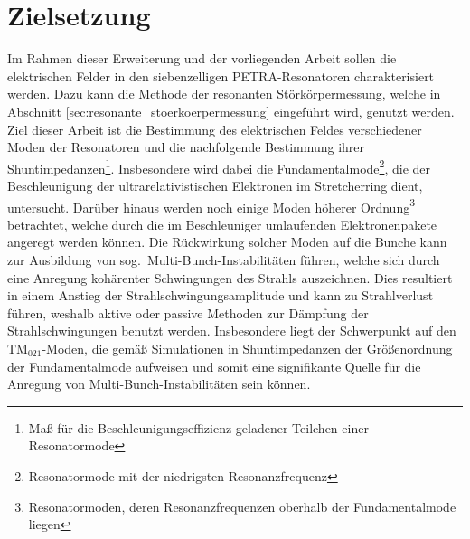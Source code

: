 \section{Zielsetzung}
Im Rahmen dieser Erweiterung und der vorliegenden Arbeit sollen die elektrischen Felder in den siebenzelligen PETRA-Resonatoren charakterisiert werden.
Dazu kann die Methode der resonanten Störkörpermessung, welche in Abschnitt \ref{sec:resonante_stoerkoerpermessung} eingeführt wird, genutzt werden.
Ziel dieser Arbeit ist die Bestimmung des elektrischen Feldes verschiedener Moden der Resonatoren und die nachfolgende Bestimmung ihrer Shuntimpedanzen\footnote{Maß für die Beschleunigungseffizienz geladener Teilchen einer Resonatormode}.
Insbesondere wird dabei die Fundamentalmode\footnote{Resonatormode mit der niedrigsten Resonanzfrequenz}, die der Beschleunigung der ultrarelativistischen Elektronen im Stretcherring dient, untersucht.
Darüber hinaus werden noch einige Moden höherer Ordnung\footnote{Resonatormoden, deren Resonanzfrequenzen oberhalb der Fun\-da\-men\-tal\-mode liegen} betrachtet, welche durch die im Beschleuniger umlaufenden Elektronenpakete angeregt werden können.
Die Rückwirkung solcher Moden auf die Bunche kann zur Ausbildung von sog.\ Multi-Bunch-Instabilitäten führen, welche sich durch eine Anregung kohärenter Schwingungen des Strahls auszeichnen.
Dies resultiert in einem Anstieg der Strahlschwingungsamplitude und kann zu Strahlverlust führen, weshalb aktive oder passive Methoden zur Dämpfung der Strahlschwingungen benutzt werden.
Insbesondere liegt der Schwerpunkt auf den $\mathrm{TM}_{021}$-Moden, die gemäß Simulationen in \cite{schedler} Shuntimpedanzen der Größenordnung der Fundamentalmode aufweisen und somit eine signifikante Quelle für die Anregung von Multi-Bunch-Instabilitäten sein können.

